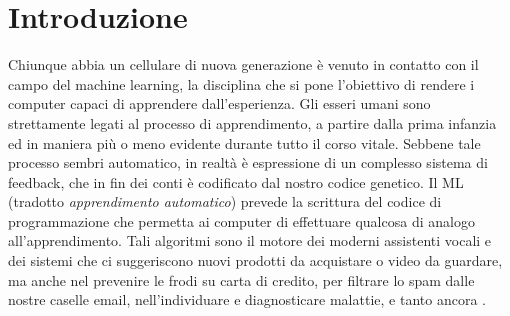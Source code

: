 \chapter{Introduzione}\label{ch:introduzione}





Chiunque abbia un cellulare di nuova generazione è venuto in contatto con il 
campo del machine learning, la disciplina che si pone l'obiettivo di rendere 
i computer capaci di apprendere dall'esperienza. 
Gli esseri umani sono strettamente legati al processo di apprendimento, a 
partire dalla prima infanzia ed in maniera più o meno evidente durante 
tutto il corso vitale. 
Sebbene tale processo sembri automatico, in realtà è espressione di un 
complesso sistema di feedback, che in fin dei conti è codificato dal 
nostro codice genetico. 
Il \ac{ML} (tradotto \emph{apprendimento automatico}) prevede la scrittura 
del codice di programmazione che permetta 
ai computer di effettuare qualcosa di analogo all'apprendimento. 
Tali algoritmi sono il motore dei moderni assistenti vocali e dei sistemi 
che ci suggeriscono nuovi prodotti da acquistare o video da guardare, ma anche 
nel prevenire le frodi su carta di credito, per filtrare lo spam dalle nostre caselle 
email, nell'individuare e diagnosticare malattie, e tanto ancora \cite{pml}. 

